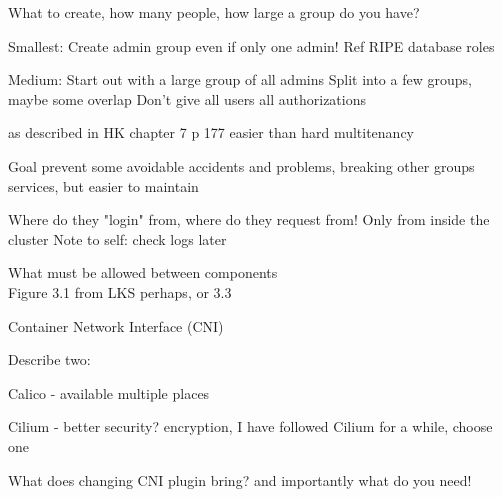 \documentclass[Screen16to9,17pt]{foils}
\begin{document}
\begin{list2}
\item
\end{list2}
What to create, how many people, how large a group do you have?

Smallest:
Create admin group even if only one admin! Ref RIPE database roles

Medium:
Start out with a large group of all admins
Split into a few groups, maybe some overlap
Don't give all users all authorizations


\begin{list2}
\item
\end{list2}
as described in HK chapter 7 p 177
easier than hard multitenancy

Goal prevent some avoidable accidents and problems, breaking other groups services, but easier to maintain



\begin{list2}
\item
\end{list2}
Where do they "login" from, where do they request from! Only from inside the cluster
Note to self: check logs later


\begin{list2}
\item What must be allowed between components\\
Figure 3.1 from LKS perhaps, or 3.3
\end{list2}

\begin{list2}
\item
Container Network Interface (CNI)
\end{list2}



Describe two:
\begin{list2}
\item Calico - available multiple places
\item Cilium - better security? encryption, I have followed Cilium for a while, choose one
\item What does changing CNI plugin bring? and importantly what do you need!
\end{list2}
\end{document}
